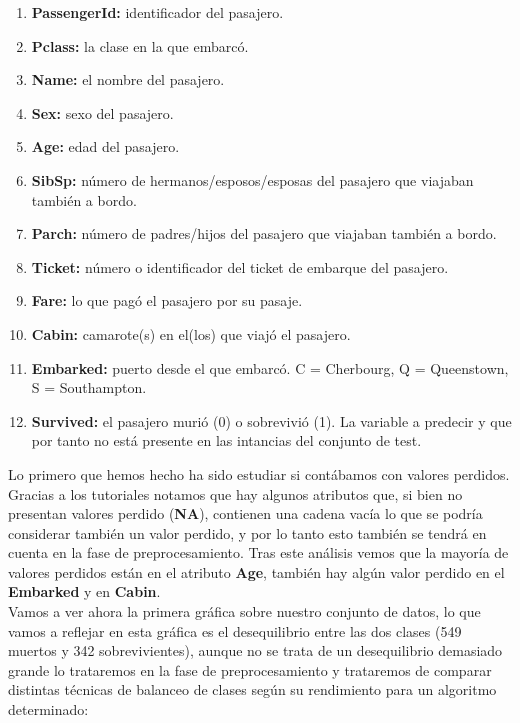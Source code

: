\documentclass[10pt,a4paper]{article}
\begin{document}
\begin{enumerate}
\item \textbf{PassengerId: } identificador del pasajero.
\item \textbf{Pclass: } la clase en la que embarcó.
\item \textbf{Name:} el nombre del pasajero.
\item \textbf{Sex: } sexo del pasajero.
\item \textbf{Age: } edad del pasajero.
\item \textbf{SibSp: } número de hermanos/esposos/esposas del pasajero que viajaban también a bordo.
\item \textbf{Parch: } número de padres/hijos del pasajero que viajaban también a bordo.
\item \textbf{Ticket: } número o identificador del ticket de embarque del pasajero.
\item \textbf{Fare: } lo que pagó el pasajero por su pasaje.
\item \textbf{Cabin: } camarote(s) en el(los) que viajó el pasajero.
\item \textbf{Embarked: } puerto desde el que embarcó. C = Cherbourg, Q = Queenstown, S = Southampton.
\item \textbf{Survived: } el pasajero murió (0) o sobrevivió (1). La variable a predecir y que por tanto no está presente en las intancias del conjunto de test.
\end{enumerate}

Lo primero que hemos hecho ha sido estudiar si contábamos con valores perdidos. Gracias a los tutoriales notamos que hay algunos atributos que, si bien no presentan valores perdido (\textbf{NA}), contienen una cadena vacía lo que se podría considerar también un valor perdido, y por lo tanto esto también se tendrá en cuenta en la fase de preprocesamiento. Tras este análisis vemos que la mayoría de valores perdidos están en el atributo \textbf{Age}, también hay algún valor perdido en el \textbf{Embarked} y en \textbf{Cabin}.\\

Vamos a ver ahora la primera gráfica sobre nuestro conjunto de datos, lo que vamos a reflejar en esta gráfica es el desequilibrio entre las dos clases (549 muertos y 342 sobrevivientes), aunque no se trata de un desequilibrio demasiado grande lo trataremos en la fase de preprocesamiento y trataremos de comparar distintas técnicas de balanceo de clases según su rendimiento para un algoritmo determinado:
\end{document}
